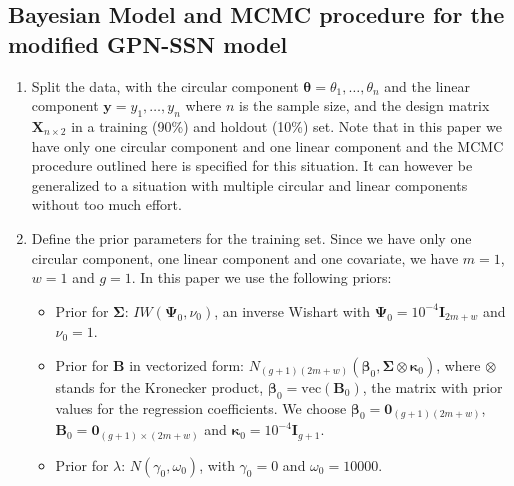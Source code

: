 \documentclass[12pt,]{article}
\begin{document}
\newpage
\subsection{Bayesian Model and MCMC procedure for the modified GPN-SSN model}\label{A3}

\begin{enumerate}
\item Split the data, with the circular component $\boldsymbol{\theta} = \theta_1, \dots, \theta_n$ and the linear component $\boldsymbol{y} = y_1, \dots, y_n$ where $n$ is the sample size, and the design matrix $\boldsymbol{X}_{n \times 2}$ in a training (90\%) and holdout (10\%) set. Note that in this paper we have only one circular component and one linear component and the MCMC procedure outlined here is specified for this situation. It can however be generalized to a situation with multiple circular and linear components without too much effort. 
\item Define the prior parameters for the training set. Since we have only one circular component, one linear component and one covariate, we have $m = 1$, $w = 1$ and $g = 1$. In this paper we use the following priors:

\begin{itemize}
\item Prior for $\boldsymbol{\Sigma}$: $IW(\boldsymbol{\Psi}_0, \nu_0)$, an inverse Wishart with $\boldsymbol{\Psi}_0 = 10^{-4}\boldsymbol{I}_{2m + w}$ and $\nu_0 = 1$.   
\item Prior for $\boldsymbol{B}$ in vectorized form: $N_{(g + 1)(2m + w)}(\boldsymbol{\beta}_0, \boldsymbol{\Sigma}  \otimes \boldsymbol{\kappa}_0)$, where $\otimes$ stands for the Kronecker product, $\boldsymbol{\beta}_0 = \text{vec}(\boldsymbol{B}_0)$, the matrix with prior values for the regression coefficients. We choose $\boldsymbol{\beta}_0 = \boldsymbol{0}_{(g + 1)(2m + w)}$, $\boldsymbol{B}_0 = \boldsymbol{0}_{(g + 1) \times (2m + w)}$ and $\boldsymbol{\kappa}_0 = 10^{-4}\boldsymbol{I}_{g + 1}$.
\item Prior for $\lambda$: $N(\gamma_0, \omega_0)$, with $\gamma_0 = 0$ and $\omega_0 = 10000$.
\end{itemize}


\end{enumerate}
\end{document}
